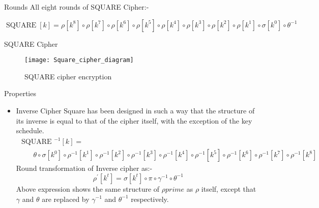 \begin{frame}{Rounds}
    All eight rounds of SQUARE Cipher:-
    \begin{beamerboxesrounded}
        $$
        \operatorname{SQUARE}[k]=\rho\left[k^{8}\right] \circ \rho\left[k^{7}\right] \circ \rho\left[k^{6}\right] \circ \rho\left[k^{5}\right] \circ \rho\left[k^{4}\right] \circ \rho\left[k^{3}\right] \circ \rho\left[k^{2}\right] \circ \rho\left[k^{1}\right] \circ \sigma\left[k^{0}\right] \circ \theta^{-1}
        $$
    \end{beamerboxesrounded}
\end{frame}
\begin{frame}{SQUARE Cipher}
    \begin{figure}
      \centering
      \texttt{[image: Square\_cipher\_diagram]}
      \caption{SQUARE cipher encryption}
    \end{figure}
\end{frame}
\begin{frame}{Properties}
    \begin{itemize}
        \item {Inverse Cipher}
            Square has been designed in such a way that the structure of its inverse is equal to that of the cipher itself, with the exception of the key schedule.
            $$
            \begin{array}{l}
            \text { SQUARE }^{-1}[k]= \\
            \qquad  \theta \circ \sigma\left[k^{0}\right] \circ \rho^{-1}\left[k^{1}\right] \circ \rho^{-1}\left[k^{2}\right] \circ \rho^{-1}\left[k^{3}\right] \circ              \rho^{-1}\left[k^{4}\right] \circ \rho^{-1}\left[k^{5}\right] \circ \rho^{-1}\left[k^{6}\right] \circ \rho^{-1}\left[k^{7}\right] \circ \rho^{-1}\left[k^{8}\right]
            \end{array}
            $$
            Round transformation  of Inverse cipher as:-
            $$
            \rho^{\prime}\left[k^{t}\right]=\sigma\left[k^{t}\right] \circ \pi \circ \gamma^{-1} \circ \theta^{-1}
            $$
            Above expression shows the same structure of $\rho{prime}$ as $\rho$ itself, except that $\gamma$ and $\theta$ are replaced by $\gamma^{-1}$ and $\theta^{-1}$    respectively.
    \end{itemize}
\end{frame}

